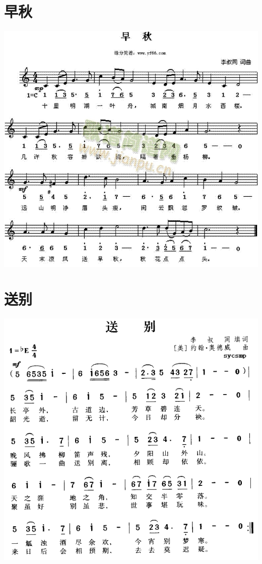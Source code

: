 \documentclass[cn,pad,twocol]{elegantbook}
\begin{document}
\section{早秋}
    \includegraphics[width=\textwidth]{dongxiao/20200909-李叔同-早秋.jpg} 
\section{送别}
    \includegraphics[width=\textwidth]{dongxiao/20200909-李叔同-送别.png} 
\end{document}
